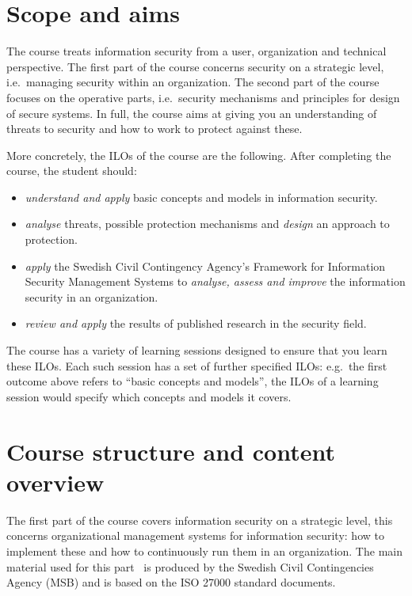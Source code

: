 \section{Scope and aims}
\label{sec:aim}
The course treats information security from a user, organization and technical 
perspective.
The first part of the course concerns security on a strategic level, i.e.\ 
managing security within an organization.
The second part of the course focuses on the operative parts, i.e.\ security 
mechanisms and principles for design of secure systems.
In full, the course aims at giving you an understanding of threats to security 
and how to work to protect against these.

More concretely, the \acp{ILO} of the course are the following.
After completing the course, the student should:
\begin{itemize}
  \item \emph{understand and apply} basic concepts and models in information 
    security.
  \item \emph{analyse} threats, possible protection mechanisms and 
    \emph{design} an approach to protection.
  \item \emph{apply} the Swedish Civil Contingency Agency's Framework for 
    Information Security Management Systems to \emph{analyse, assess and 
      improve} the information security in an organization.
  \item \emph{review and apply} the results of published research in the 
    security field.
\end{itemize}
The course has a variety of learning sessions designed to ensure that you learn 
these \acp{ILO}.
Each such session has a set of further specified \acp{ILO}:
e.g.\ the first outcome above refers to \enquote{basic concepts and models}, 
the \acp{ILO} of a learning session would specify which concepts and models it 
covers.


\section{Course structure and content overview}
\label{sec:outline}

The first part of the course covers information security on a strategic level, 
this concerns organizational management systems for information security: how 
to implement these and how to continuously run them in an organization.
The main material used for this part~\cite{%
  MSB2011itm,MSB2011sle,MSB2011p,%
	MSB2011v,MSB2011r,MSB2011gap,MSB2011gb,%
	MSB2011vs,MSB2011us,MSB2011upo,%
	MSB2011pg,MSB2011koa,MSB2011i,%
	MSB2011o,MSB2011g,MSB2011lg,%
	MSB2011ulo,MSB2011kf,MSB2011fa%
} is produced by the Swedish Civil Contingencies Agency (MSB) and is based on 
the ISO 27000 standard documents.

